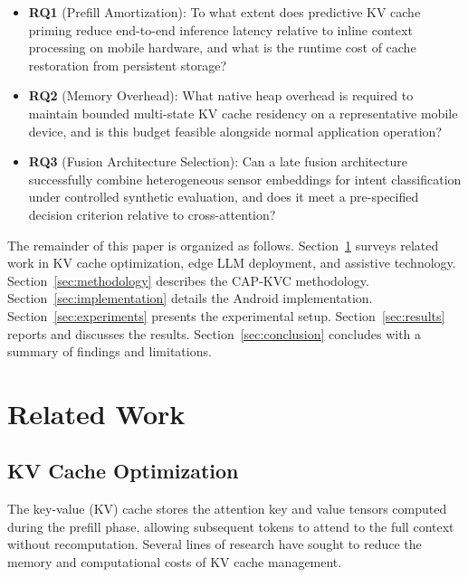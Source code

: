 \documentclass[journal]{IEEEtran}
\begin{document}
\begin{itemize}
    \item \textbf{RQ1} (Prefill Amortization): To what extent does predictive KV cache priming reduce end-to-end inference latency relative to inline context processing on mobile hardware, and what is the runtime cost of cache restoration from persistent storage?
    \item \textbf{RQ2} (Memory Overhead): What native heap overhead is required to maintain bounded multi-state KV cache residency on a representative mobile device, and is this budget feasible alongside normal application operation?
    \item \textbf{RQ3} (Fusion Architecture Selection): Can a late fusion architecture successfully combine heterogeneous sensor embeddings for intent classification under controlled synthetic evaluation, and does it meet a pre-specified decision criterion relative to cross-attention?
\end{itemize}

The remainder of this paper is organized as follows. Section~\ref{sec:related} surveys related work in KV cache optimization, edge LLM deployment, and assistive technology. Section~\ref{sec:methodology} describes the CAP-KVC methodology. Section~\ref{sec:implementation} details the Android implementation. Section~\ref{sec:experiments} presents the experimental setup. Section~\ref{sec:results} reports and discusses the results. Section~\ref{sec:conclusion} concludes with a summary of findings and limitations.

\section{Related Work}
\label{sec:related}

\subsection{KV Cache Optimization}
\label{sec:related_kvcache}

The key-value (KV) cache stores the attention key and value tensors computed during the prefill phase, allowing subsequent tokens to attend to the full context without recomputation. Several lines of research have sought to reduce the memory and computational costs of KV cache management.
\end{document}
